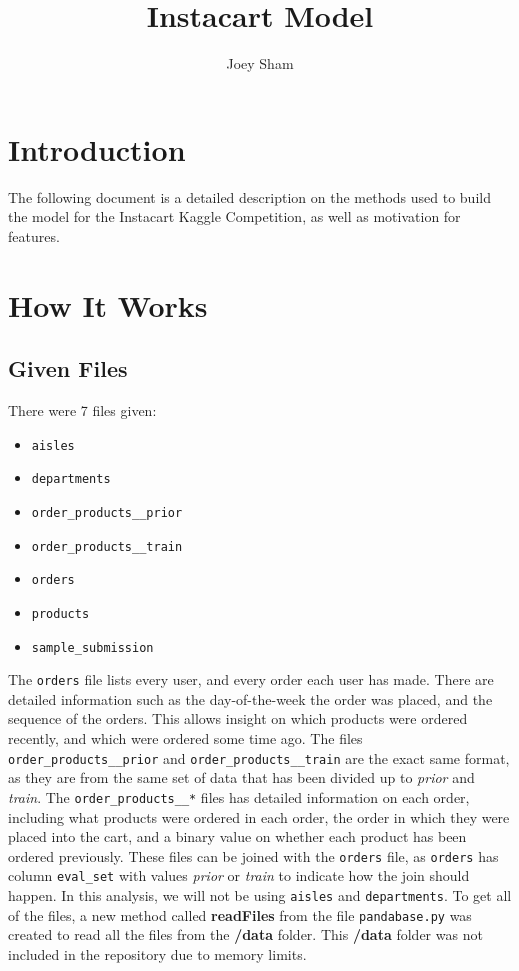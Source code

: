 \documentclass[12pt]{article}
\begin{document}
\title{Instacart Model}
\author{Joey Sham}

\maketitle

\section{Introduction}
The following document is a detailed description on the methods used to build the model for the Instacart Kaggle Competition, as well as motivation for features.


\section{How It Works}

\subsection{Given Files}
There were 7 files given:
\begin{itemize}
\item \texttt{aisles}
\item \texttt{departments}
\item \texttt{order\_products\_\_prior}
\item \texttt{order\_products\_\_train}
\item \texttt{orders}
\item \texttt{products}
\item \texttt{sample\_submission}
\end{itemize}

The \texttt{orders} file lists every user, and every order each user has made. There are detailed information such as the day-of-the-week the order was placed, and the sequence of the orders. This allows insight on which products were ordered recently, and which were ordered some time ago.
\newline\newline
The files \texttt{order\_products\_\_prior} and \texttt{order\_products\_\_train} are the exact same format, as they are from the same set of data that has been divided up to \textit{prior} and \textit{train}. The \texttt{order\_products\_\_*} files has detailed information on each order, including what products were ordered in each order, the order in which they were placed into the cart, and a binary value on whether each product has been ordered previously. These files can be joined with the \texttt{orders} file, as \texttt{orders} has column \texttt{eval\_set} with values \textit{prior} or \textit{train} to indicate how the join should happen.
\newline\newline
In this analysis, we will not be using \texttt{aisles} and \texttt{departments}.
\newline\newline
To get all of the files, a new method called \textbf{readFiles} from the file \texttt{pandabase.py} was created to read all the files from the \textbf{/data} folder. This \textbf{/data} folder was not included in the repository due to memory limits.
\end{document}
